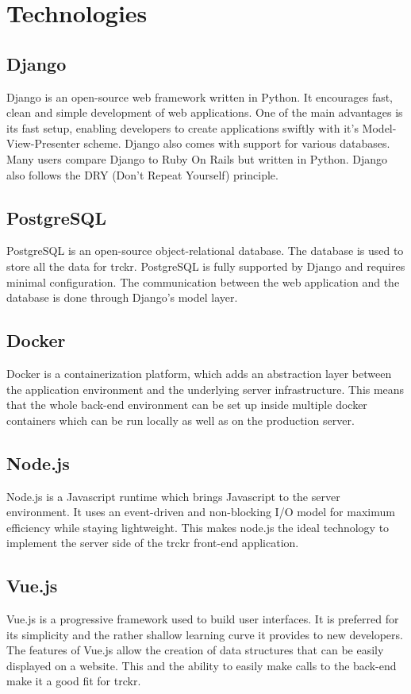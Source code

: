 \documentclass[bibliography=totoc, listof=totocnumbered]{scrartcl}
\begin{document}
\section{Technologies}
\subsection{Django}
Django is an open-source web framework written in Python.\cite{django} It
encourages fast, clean and simple development of web applications. One of the
main advantages is its fast setup, enabling developers to create applications
swiftly with it's Model-View-Presenter scheme. Django also comes with support
for various databases. Many users compare Django to Ruby On Rails but written in
Python. Django also follows the DRY (Don't Repeat Yourself) principle.

\subsection{PostgreSQL}
PostgreSQL is an open-source object-relational database.\cite{postgre} The
database is used to store all the data for trckr. PostgreSQL is fully supported
by Django and requires minimal configuration. The communication between the web
application and the database is done through Django's model layer.

\subsection{Docker}
Docker is a containerization platform, which adds an abstraction layer between
the application environment and the underlying server
infrastructure\cite{docker}. This means that the whole back-end environment can
be set up inside multiple docker containers which can be run locally as well as
on the production server.

\subsection{Node.js}
Node.js is a Javascript runtime which brings Javascript to the server
environment.\cite{nodejs} It uses an event-driven and non-blocking I/O model for
maximum efficiency while staying lightweight. This makes node.js the ideal
technology to implement the server side of the trckr front-end application.

\subsection{Vue.js}
Vue.js is a progressive framework used to build user interfaces\cite{vuejs}. It
is preferred for its simplicity and the rather shallow learning curve it
provides to new developers. The features of Vue.js allow the creation of data
structures that can be easily displayed on a website. This and the ability to
easily make calls to the back-end make it a good fit for trckr.
\end{document}
